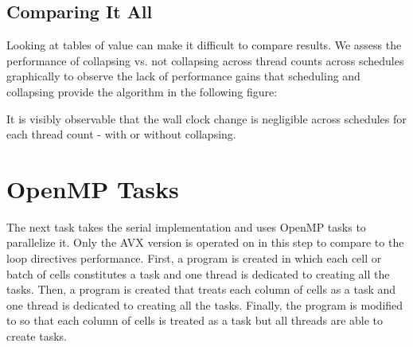 \documentclass{article}
\begin{document}
\subsection{Comparing It All}
Looking at tables of value can make it difficult to compare results. We assess 
the performance of collapsing vs. not collapsing across thread counts across schedules 
graphically to observe the lack of performance gains that scheduling and collapsing provide 
the algorithm in the following figure:
\begin{figure}[H]
    \centering
\end{figure}
\noindent It is visibly observable that the wall clock change is negligible across schedules for each thread count - with or without collapsing. 

\section{OpenMP Tasks}
The next task takes the serial implementation and uses OpenMP tasks to parallelize it. Only 
the AVX version is operated on in this step to compare to the loop directives performance. First, 
a program is created in which each cell or batch of cells constitutes a task and one thread 
is dedicated to creating all the tasks. Then, a program is created that treats each 
column of cells as a task and one thread is dedicated to creating all the tasks. Finally, 
the program is modified to so that each column of cells is treated as a task but all threads are able to create tasks.
\end{document}
